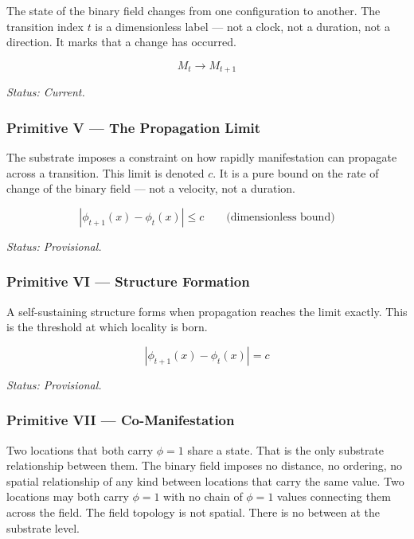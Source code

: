 \documentclass[12pt, letterpaper]{article}
\begin{document}
The state of the binary field changes from one configuration to another.
The transition index \(t\) is a dimensionless label --- not a clock, not a
duration, not a direction. It marks that a change has occurred.

\begin{formulabox}
\begin{equation}
M_t \to M_{t+1}
\tag{6}
\end{equation}
\end{formulabox}

\emph{Status: Current.}
\subsubsection{Primitive V --- The Propagation Limit}
\label{sec:org125eb30}

The substrate imposes a constraint on how rapidly manifestation can propagate
across a transition. This limit is denoted \(c\). It is a pure bound on the rate
of change of the binary field --- not a velocity, not a duration.

\begin{formulabox}
\begin{equation}
|\phi_{t+1}(x) - \phi_t(x)| \leq c \qquad \text{(dimensionless bound)}
\tag{7}
\end{equation}
\end{formulabox}

\emph{Status: Provisional.}
\subsubsection{Primitive VI --- Structure Formation}
\label{sec:org7c233c8}

A self-sustaining structure forms when propagation reaches the limit exactly.
This is the threshold at which locality is born.

\begin{formulabox}
\begin{equation}
|\phi_{t+1}(x) - \phi_t(x)| = c
\tag{8}
\end{equation}
\end{formulabox}

\emph{Status: Provisional.}
\subsubsection{Primitive VII --- Co-Manifestation}
\label{sec:org9453e56}

Two locations that both carry \(\phi = 1\) share a state. That is the only
substrate relationship between them. The binary field imposes no distance, no
ordering, no spatial relationship of any kind between locations that carry the
same value. Two locations may both carry \(\phi = 1\) with no chain of
\(\phi = 1\) values connecting them across the field. The field topology is not
spatial. There is no between at the substrate level.
\end{document}
